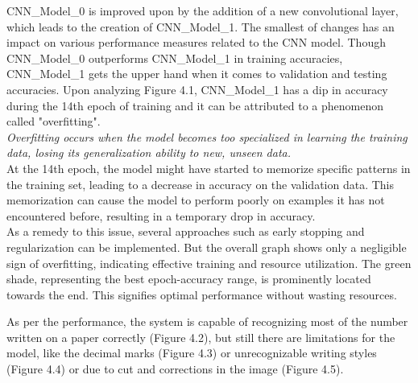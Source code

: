 \noindent CNN\_Model\_0 is improved upon by the addition of a new convolutional layer, which leads to the creation of CNN\_Model\_1. The smallest of changes has an impact on various performance measures related to the CNN model. Though CNN\_Model\_0 outperforms CNN\_Model\_1 in training accuracies, CNN\_Model\_1 gets the upper hand when it comes to validation and testing accuracies. Upon analyzing Figure 4.1, CNN\_Model\_1 has a dip in accuracy during the 14th epoch of training and it can be attributed to a phenomenon called "overfitting".\\

\noindent \textit{Overfitting occurs when the model becomes too specialized in learning the training data, losing its generalization ability to new, unseen data.}\\

\noindent At the 14th epoch, the model might have started to memorize specific patterns in the training set, leading to a decrease in accuracy on the validation data. This memorization can cause the model to perform poorly on examples it has not encountered before, resulting in a temporary drop in accuracy.\\

\noindent As a remedy to this issue, several approaches such as early stopping and regularization can be implemented. But the overall graph shows only a negligible sign of overfitting, indicating effective training and resource utilization. The green shade, representing the best epoch-accuracy range, is prominently located towards the end. This signifies optimal performance without wasting resources.

\clearpage

\noindent
As per the performance, the system is capable of recognizing most of the number written on a paper correctly (Figure 4.2), but still there are limitations for the model, like the decimal marks (Figure 4.3) or unrecognizable writing styles (Figure 4.4) or due to cut and corrections in the image (Figure 4.5).

\vspace{3mm}

